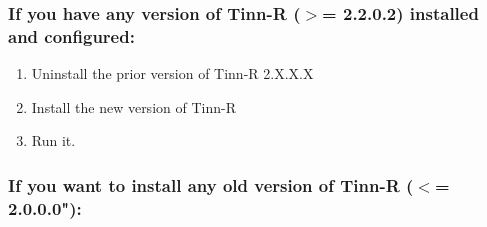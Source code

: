 \subsubsection{If you have any version of Tinn-R ($>$= 2.2.0.2) installed and configured:}

\begin{enumerate}
  \item Uninstall the prior version of Tinn-R 2.X.X.X
  \item Install the new version of Tinn-R
  \item Run it.
\end{enumerate}


\subsubsection{If you want to install any old version of Tinn-R ($<$= 2.0.0.0"):}

